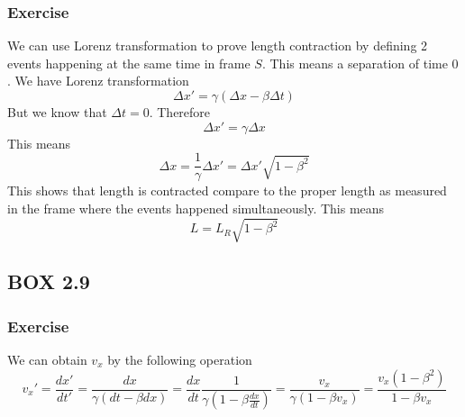 \documentclass[12pt]{article}
\newcommand{\dydx}[2]{\frac{d #1}{d #2}}
\newcommand{\paren}[1]{\left( #1 \right)}
\begin{document}
        \subsubsection{Exercise}
        We can use Lorenz transformation to prove length contraction by defining 2 events happening at the same time in frame $S$. This means a separation of time $0$. We have Lorenz transformation
        \[
        \Delta x' = \gamma\paren{\Delta x - \beta\Delta t}
        \]
        But we know that $\Delta t = 0$. Therefore
        \[
        \Delta x' = \gamma\Delta x
        \]
        This means
        \[
        \Delta x = \frac{1}{\gamma}\Delta x' = \Delta x'\sqrt{1-\beta^2}
        \]
        This shows that length is contracted compare to the proper length as measured in the frame where the events happened simultaneously. This means
        \[
        L = L_R\sqrt{1-\beta^2}
        \]

    \subsection{BOX 2.9}
        \subsubsection{Exercise}
        We can obtain $v_x$ by the following operation
        \[
        v_x' = \dydx{x'}{t'} = \frac{dx}{\gamma\paren{dt - \beta dx}} = \frac{dx}{dt}\frac{1}{\gamma\paren{1-\beta\dydx{x}{t}}} = \frac{v_x}{\gamma\paren{1-\beta v_x}} = \frac{v_x\paren{1-\beta^2}}{1-\beta v_x}
        \]
\end{document}
